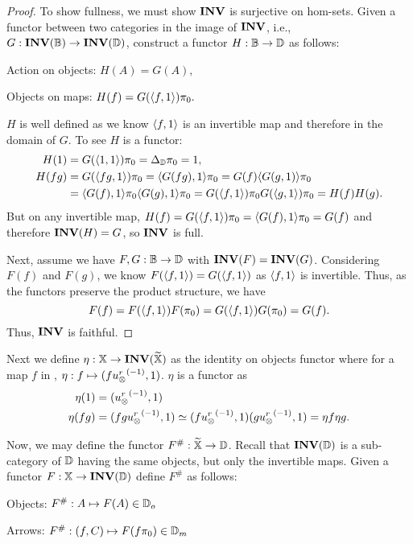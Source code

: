 \begin{proof}
  To show fullness, we must show $\mathbf{INV}$ is surjective on hom-sets. Given a functor between two
  categories in the image of $\mathbf{INV}$, i.e., $G:\mathbf{INV}({\mathbb{B}})\to \mathbf{INV}({\mathbb{D}})$, construct a functor
  $H:\mathbb{B}\to\mathbb{D}$ as follows:
  \begin{description}
    \item{Action on objects:} $H(A) = G(A),$
    \item{Objects on maps:} $H(f) = G(\langle f,1\rangle)\pi_0.$
  \end{description}
  $H$ is well defined as we know $\langle f,1\rangle$ is an invertible map and therefore in the domain of $G$.
  To see $H$ is a functor:
  \begin{align*}
    H(1) &= G(\langle1,1\rangle)\pi_0 = \Delta_{\mathbb{D}}\pi_0 = 1,\\
    H(f g) &= G(\langle f g,1\rangle)\pi_0 = \langle G(f g),1\rangle\pi_0 = G(f)\langle G(g,1)\rangle\pi_0 \\
    &= \langle G(f),1\rangle\pi_0 \langle G(g),1\rangle\pi_0 = G(\langle f,1\rangle)\pi_0 G(\langle g,1\rangle)\pi_0 = H(f)H(g).
  \end{align*}
  But on any invertible map, $H(f) = G(\langle f,1\rangle)\pi_0 = \langle G(f),1\rangle\pi_0 = G(f)$ and therefore
  $\mathbf{INV}({H}) = G$, so $\mathbf{INV}$ is full.

  Next, assume we have $F,G:\mathbb{B}\to\mathbb{D}$ with $\mathbf{INV}({F}) = \mathbf{INV}({G})$. Considering $F(f)$ and $F(g)$, we
  know $F(\langle f,1\rangle) = G(\langle f,1\rangle) $ as $\langle f,1\rangle$ is invertible. Thus, as the functors preserve the
  product structure, we have
  \[
    F(f) = F(\langle f,1\rangle)F(\pi_0)= G(\langle f,1\rangle)G(\pi_0)= G(f).
  \]
  Thus, $\mathbf{INV}$ is faithful.
\end{proof}


Next we define  $\eta:\mathbb{X} \to \mathbf{INV}({\widetilde{\mathbb{X}}})$ as the identity on objects functor where for a map $f$ in
\X, $\eta: f \mapsto (f{u_{\otimes}^r}^{(-1)},1)$. $\eta$ is a functor as
\begin{align*}
  \eta(1) & = ({u_{\otimes}^r}^{(-1)},1)\\
  \eta(f g) &= (f g{u_{\otimes}^r}^{(-1)},1) \overset{\scriptscriptstyle }{\simeq} (f{u_{\otimes}^r}^{(-1)},1)(g{u_{\otimes}^r}^{(-1)},1) = \eta{f}\eta{g}.
\end{align*}

Now, we may define the functor $F^{\#}:\widetilde{\mathbb{X}} \to \mathbb{D}$. Recall that $\mathbf{INV}({\mathbb{D}})$ is a sub-category of $\mathbb{D}$
having the same objects, but only the invertible maps. Given a functor $F:\mathbb{X} \to \mathbf{INV}({\mathbb{D}})$ define
$F^{\#}$ as follows:
\begin{description}
  \item{Objects:} $F^{\#}:A \mapsto F(A) \in \mathbb{D}_{o}$
  \item{Arrows:} $F^{\#}:(f,C) \mapsto F(f\pi_0)\in \mathbb{D}_{m}$
\end{description}

